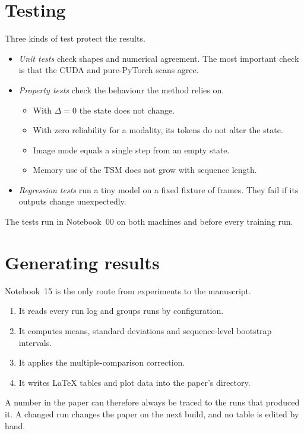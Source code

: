 

\section{Testing}

Three kinds of test protect the results.
\begin{itemize}
  \item \emph{Unit tests} check shapes and numerical agreement. The most
        important check is that the CUDA and pure-PyTorch scans agree.
  \item \emph{Property tests} check the behaviour the method relies on.
        \begin{itemize}
          \item With $\Delta=0$ the state does not change.
          \item With zero reliability for a modality, its tokens do not alter
                the state.
          \item Image mode equals a single step from an empty state.
          \item Memory use of the TSM does not grow with sequence length.
        \end{itemize}
  \item \emph{Regression tests} run a tiny model on a fixed fixture of
        frames. They fail if its outputs change unexpectedly.
\end{itemize}
The tests run in Notebook~00 on both machines and before every training
run.

\section{Generating results}
\label{sec:nb-results}

Notebook~15 is the only route from experiments to the manuscript.
\begin{enumerate}
  \item It reads every run log and groups runs by configuration.
  \item It computes means, standard deviations and sequence-level bootstrap
        intervals.
  \item It applies the multiple-comparison correction.
  \item It writes LaTeX tables and plot data into the paper's directory.
\end{enumerate}
A number in the paper can therefore always be traced to the runs that
produced it. A changed run changes the paper on the next build, and no table
is edited by hand.
